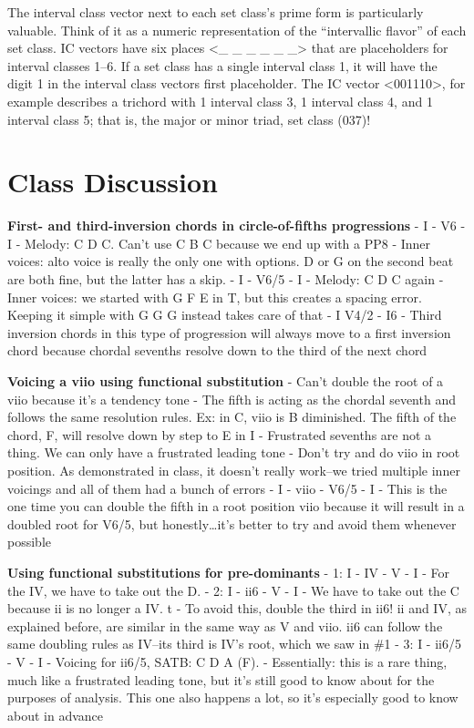 \documentclass{book}
\begin{document}
The interval class vector next to each set class's prime form is particularly
valuable. Think of it as a numeric representation of the ``intervallic
flavor'' of each set class. IC vectors have six places \textless\_ \_ \_ \_ \_
\_\textgreater{} that are placeholders for interval classes 1--6. If a set
class has a single interval class 1, it will have the digit 1 in the interval
class vectors first placeholder. The IC vector \textless001110\textgreater,
for example describes a trichord with 1 interval class 3, 1 interval class 4,
and 1 interval class 5; that is, the major or minor triad, set class (037)!

\hypertarget{class-discussion-57}{%
\chapter{Class Discussion}\label{class-discussion-57}}

\textbf{First- and third-inversion chords in circle-of-fifths progressions} -
I - V6 - I - Melody: C D C. Can't use C B C because we end up with a PP8 -
Inner voices: alto voice is really the only one with options. D or G on the
second beat are both fine, but the latter has a skip. - I - V6/5 - I - Melody:
C D C again - Inner voices: we started with G F E in T, but this creates a
spacing error. Keeping it simple with G G G instead takes care of that - I
V4/2 - I6 - Third inversion chords in this type of progression will always
move to a first inversion chord because chordal sevenths resolve down to the
third of the next chord

\textbf{Voicing a viio using functional substitution} - Can't double the root
of a viio because it's a tendency tone - The fifth is acting as the chordal
seventh and follows the same resolution rules. Ex: in C, viio is B diminished.
The fifth of the chord, F, will resolve down by step to E in I - Frustrated
sevenths are not a thing. We can only have a frustrated leading tone - Don't
try and do viio in root position. As demonstrated in class, it doesn't really
work--we tried multiple inner voicings and all of them had a bunch of errors -
I - viio - V6/5 - I - This is the one time you can double the fifth in a root
position viio because it will result in a doubled root for V6/5, but
honestly\ldots it's better to try and avoid them whenever possible

\textbf{Using functional substitutions for pre-dominants} - 1: I - IV - V - I
- For the IV, we have to take out the D. - 2: I - ii6 - V - I - We have to
take out the C because ii is no longer a IV. t - To avoid this, double the
third in ii6! ii and IV, as explained before, are similar in the same way as V
and viio. ii6 can follow the same doubling rules as IV--its third is IV's
root, which we saw in \#1 - 3: I - ii6/5 - V - I - Voicing for ii6/5, SATB: C
D A (F). - Essentially: this is a rare thing, much like a frustrated leading
tone, but it's still good to know about for the purposes of analysis. This one
also happens a lot, so it's especially good to know about in advance
\end{document}
